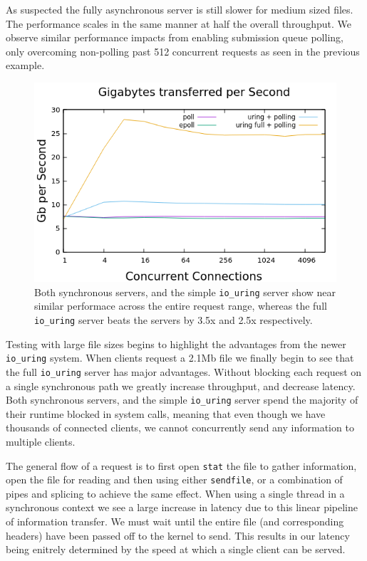 \documentclass[letterpaper, 10pt, twocolumn]{article}
\begin{document}
As suspected the fully asynchronous server is still slower for medium sized files. The performance scales in the same manner at half the overall throughput. We observe similar performance impacts from enabling submission queue polling, only overcoming non-polling past 512 concurrent requests as seen in the previous example.

\begin{figure}
\centering
\includegraphics[width=4.5in]{gbps.png}
\caption{Both synchronous servers, and the simple \texttt{io\_uring} server show near similar performace across the entire request range, whereas the full \texttt{io\_uring} server beats the servers by 3.5x and 2.5x respectively.}
\end{figure}

Testing with large file sizes begins to highlight the advantages from the newer \texttt{io\_uring} system. When clients request a 2.1Mb file we finally begin to see that the full \texttt{io\_uring} server has major advantages. Without blocking each request on a single synchronous path we greatly increase throughput, and decrease latency. Both synchronous servers, and the simple \texttt{io\_uring} server spend the majority of their runtime blocked in system calls, meaning that even though we have thousands of connected clients, we cannot concurrently send any information to multiple clients.

The general flow of a request is to first open \texttt{stat} the file to gather information, open the file for reading and then using either \texttt{sendfile}, or a combination of pipes and splicing to achieve the same effect. When using a single thread in a synchronous context we see a large increase in latency due to this linear pipeline of information transfer. We must wait until the entire file (and corresponding headers) have been passed off to the kernel to send. This results in our latency being enitrely determined by the speed at which a single client can be served.
\end{document}
